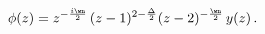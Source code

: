 \begin{equation}
 \phi (z) = 
z^{-{i\wn\over 2}}\, (z-1)^{2-{\Delta \over 2}}
(z-2)^{-{\wn\over 2}}\, y(z)\,.
\end{equation}

